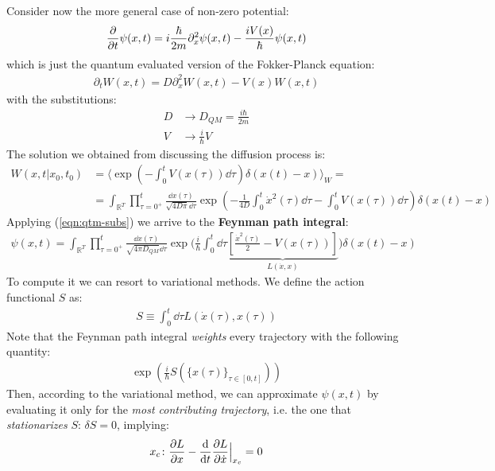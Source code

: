 \documentclass[../template.tex]{subfiles}
\begin{document}
Consider now the more general case of non-zero potential:
\begin{align*}
    \pdv{t} \psi(x,t) = i \frac{\hbar}{2m} \partial_x^2 \psi(x,t) - \frac{iV(x)}{\hbar} \psi(x,t)   
\end{align*}
which is just the quantum evaluated version of the Fokker-Planck equation:
\begin{align*}
    \partial_t W(x,t) = D \partial_x^2 W(x,t) - V(x) W(x,t)
\end{align*}
with the substitutions:
\begin{align} \label{eqn:qtm-subs}
    D &\to D_{QM} = \frac{i \hbar}{2m}\\ \nonumber
    V &\to \frac{i}{\hbar}V  
\end{align}
The solution we obtained from discussing the diffusion process is:
\begin{align*}
    W(x,t|x_0,t_0) &= \langle \exp\left(-\int_0^t V(x(\tau))\dd{\tau}\right) \delta(x(t)-x)\rangle_W = \\
    &= \int_{\mathbb{R}^T} \prod_{\tau = 0^+}^t \frac{\dd{x(\tau)}}{\sqrt{4 D \pi} \dd{\tau}} \exp\left(-\frac{1}{4D} \int_0^t \dot{x}^2(\tau) \dd{\tau} - \int_0^t V(x(\tau))\dd{\tau} \right) \delta(x(t)-x)
\end{align*}
Applying (\ref{eqn:qtm-subs}) we arrive to the \textbf{Feynman path integral}: 
\begin{align*} \label{eqn:feynman-path}
    \psi(x,t) = \int_{\mathbb{R}^T} \prod_{\tau = 0^+}^t \frac{\dd{x(\tau)}}{\sqrt{4 \pi D_{QM}}\dd{\tau}}\exp\Big(\frac{i}{\hbar} \int_0^t \dd{\tau} \underbrace{\left[\frac{\dot{x}^2(\tau)}{2} - V(x(\tau)) \right]}_{L(\dot{x},x)}  \Big)  \delta(x(t)-x)
\end{align*}
To compute it we can resort to variational methods. We define the action functional $S$ as: 
\begin{align*}
    S \equiv \int_0^t \dd{\tau} L(\dot{x}(\tau), x(\tau))
\end{align*} 
Note that the Feynman path integral \textit{weights} every trajectory with the following quantity:
\begin{align*}
    \exp\left(\frac{i}{\hbar} S\left(\{x(\tau)\}_{\tau\in[0,t]}\right) \right)
\end{align*} 
Then, according to the variational method, we can approximate $\psi(x,t)$ by evaluating it only for the \textit{most contributing trajectory}, i.e. the one that \textit{stationarizes} $S$: $\delta S = 0$, implying:
\begin{align*}
    x_c \colon 
    \pdv{L}{x} - \dv{t} \pdv{L}{\dot{x}} \Big|_{x_c} = 0
\end{align*}     
\end{document}
